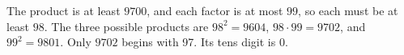 The product is at least $9700$, and each factor is at most $99$, so each must be at least $98$. The three possible products are $98^2=9604$, $98\cdot99=9702$, and $99^2=9801$. Only $9702$ begins with 97. Its tens digit is $\boxed0$.
